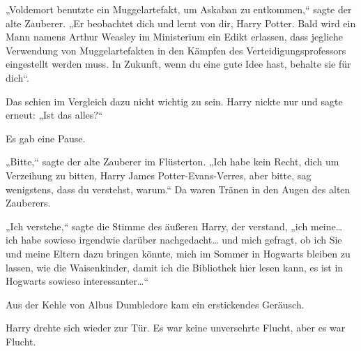 „Voldemort benutzte ein Muggelartefakt, um Askaban zu entkommen,“ sagte der alte Zauberer. „Er beobachtet dich und lernt von dir, Harry Potter. Bald wird ein Mann namens Arthur Weasley im Ministerium ein Edikt erlassen, dass jegliche Verwendung von Muggelartefakten in den Kämpfen des Verteidigungsprofessors eingestellt werden muss. In Zukunft, wenn du eine gute Idee hast, behalte sie für dich“.

Das schien im Vergleich dazu nicht wichtig zu sein. Harry nickte nur und sagte erneut: „Ist das alles?“

Es gab eine Pause.

„Bitte,“ sagte der alte Zauberer im Flüsterton. „Ich habe kein Recht, dich um Verzeihung zu bitten, Harry James Potter-Evans-Verres, aber bitte, sag wenigstens, dass du verstehst, warum.“ Da waren Tränen in den Augen des alten Zauberers.

„Ich verstehe,“ sagte die Stimme des äußeren Harry, der verstand, „ich meine… ich habe sowieso irgendwie darüber nachgedacht… und mich gefragt, ob ich Sie und meine Eltern dazu bringen könnte, mich im Sommer in Hogwarts bleiben zu lassen, wie die Waisenkinder, damit ich die Bibliothek hier lesen kann, es ist in Hogwarts sowieso interessanter…“

Aus der Kehle von Albus Dumbledore kam ein erstickendes Geräusch.

Harry drehte sich wieder zur Tür. Es war keine unversehrte Flucht, aber es war Flucht.

